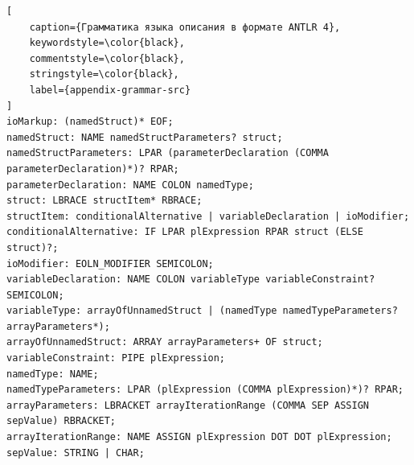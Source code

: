 \documentclass[times,specification,annotation]{style/itmo-student-thesis/itmo-student-thesis}
\begin{document}
\begin{lstlisting}[
    caption={Грамматика языка описания в формате ANTLR 4},
    keywordstyle=\color{black},
    commentstyle=\color{black},
    stringstyle=\color{black},
    label={appendix-grammar-src}
]
ioMarkup: (namedStruct)* EOF;
namedStruct: NAME namedStructParameters? struct;
namedStructParameters: LPAR (parameterDeclaration (COMMA parameterDeclaration)*)? RPAR;
parameterDeclaration: NAME COLON namedType;
struct: LBRACE structItem* RBRACE;
structItem: conditionalAlternative | variableDeclaration | ioModifier;
conditionalAlternative: IF LPAR plExpression RPAR struct (ELSE struct)?;
ioModifier: EOLN_MODIFIER SEMICOLON;
variableDeclaration: NAME COLON variableType variableConstraint? SEMICOLON;
variableType: arrayOfUnnamedStruct | (namedType namedTypeParameters? arrayParameters*);
arrayOfUnnamedStruct: ARRAY arrayParameters+ OF struct;
variableConstraint: PIPE plExpression;
namedType: NAME;
namedTypeParameters: LPAR (plExpression (COMMA plExpression)*)? RPAR;
arrayParameters: LBRACKET arrayIterationRange (COMMA SEP ASSIGN sepValue) RBRACKET;
arrayIterationRange: NAME ASSIGN plExpression DOT DOT plExpression;
sepValue: STRING | CHAR;
\end{lstlisting}
\end{document}
